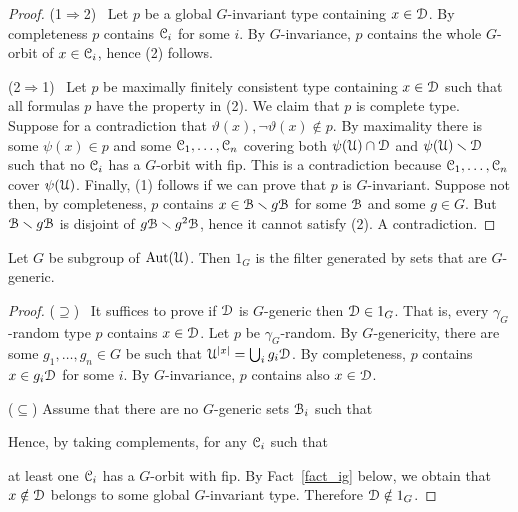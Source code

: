 \documentclass{amsproc}
\begin{document}
\begin{proof}
  (1$\Rightarrow$2) \ Let $p$ be a global $G$-invariant type containing $x\in\EuScript D$.
  By completeness $p$ contains $\EuScript C_i$ for some $i$.
  By $G$-invariance, $p$ contains the whole $G$-orbit of $x\in\EuScript C_i$, hence (2) follows.
  
  (2$\Rightarrow$1) \ Let $p$ be maximally finitely consistent type containing $x\in\EuScript D$ such that all formulas $p$ have the property in (2).
  We claim that $p$ is complete type.
  Suppose for a contradiction that $\vartheta(x),\neg\vartheta(x)\notin p$.
  By maximality there is some $\psi(x)\in p$ and some $\EuScript C_1,\dots,\EuScript C_n$ covering both $\psi(\EuScript U)\cap\EuScript D$ and $\psi(\EuScript U)\smallsetminus\EuScript D$ such that no $\EuScript C_i$ has a $G$-orbit with fip.
  This is a contradiction because $\EuScript C_1,\dots,\EuScript C_n$ cover $\psi(\EuScript U)$.
  Finally, (1) follows if we can prove that $p$ is $G$-invariant.
  Suppose not then, by completeness, $p$ contains $x\in\EuScript B\smallsetminus g\EuScript B$ for some $\EuScript B$ and some $g\in G$.
  But $\EuScript B\smallsetminus g\EuScript B$ is disjoint of $g\EuScript B\smallsetminus g^2\EuScript B$, hence it cannot satisfy (2).
  A contradiction.
\end{proof}

\begin{fact}
  Let $G$ be subgroup of ${\rm Aut}(\EuScript U)$.
  Then $1_G$ is the filter generated by sets that are $G$-generic.
\end{fact}
  
\begin{proof}
  ($\supseteq$) \ It suffices to prove if $\EuScript D$ is $G$-generic then $\EuScript D\in1_G$.
  That is, every $\gamma_G$-random type $p$ contains $x\in\EuScript D$.
  Let $p$ be $\gamma_G$-random.
  By $G$-genericity, there are some $g_1,\dots,g_n\in G$ be such that $\EuScript U^{|x|}=\bigcup_i g_i\EuScript D$.
  By completeness, $p$ contains $x\in g_i\EuScript D$ for some $i$.
  By $G$-invariance, $p$ contains also $x\in\EuScript D$.

  ($\subseteq$) Assume that there are no $G$-generic sets $\EuScript B_i$ such that 


  Hence, by taking complements, for any $\EuScript C_i$ such that 
  

  at least one $\EuScript C_i$ has a $G$-orbit with fip.
  By Fact~\ref{fact_ig} below, we obtain that $x\notin\EuScript D$ belongs to some global $G$-invariant type.
  Therefore $\EuScript D\notin1_G$.
\end{proof}
\end{document}
